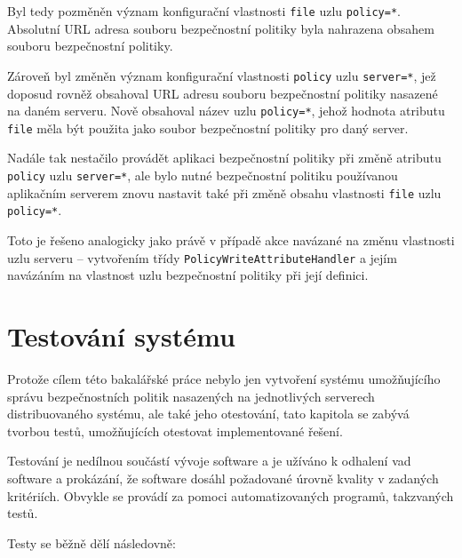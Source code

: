 Byl tedy pozměněn význam konfigurační vlastnosti {\tt file} uzlu {\tt policy=*}. Absolutní URL adresa souboru bezpečnostní politiky byla nahrazena obsahem souboru bezpečnostní politiky.

Zároveň byl změněn význam konfigurační vlastnosti {\tt policy} uzlu {\tt server=*}, jež doposud rovněž obsahoval URL adresu souboru bezpečnostní politiky nasazené na daném serveru.
Nově obsahoval název uzlu {\tt policy=*}, jehož hodnota atributu {\tt file} měla být použita jako soubor bezpečnostní politiky pro daný server.

Nadále tak nestačilo provádět aplikaci bezpečnostní politiky při změně atributu {\tt policy} uzlu {\tt server=*}, ale bylo nutné bezpečnostní politiku používanou aplikačním serverem znovu nastavit také při změně obsahu vlastnosti {\tt file} uzlu {\tt policy=*}.

Toto je řešeno analogicky jako právě v případě akce navázané na změnu vlastnosti uzlu serveru -- vytvořením třídy {\tt PolicyWriteAttributeHandler} a jejím navázáním na vlastnost uzlu bezpečnostní politiky při její definici.

\chapter{Testování systému} \label{testovani}

Protože cílem této bakalářské práce nebylo jen vytvoření systému umožňujícího správu bezpečnostních politik nasazených na jednotlivých serverech distribuovaného systému, ale také jeho otestování, tato kapitola se zabývá tvorbou testů, umožňujících otestovat implementované řešení.

Testování je nedílnou součástí vývoje software a je užíváno k odhalení vad software a prokázání, že software dosáhl požadované úrovně kvality v zadaných kritériích. Obvykle se provádí za pomoci automatizovaných programů, takzvaných testů. \cite{ivsTest}

Testy se běžně dělí následovně: \cite{testsTypes}\cite{ivsTest}

